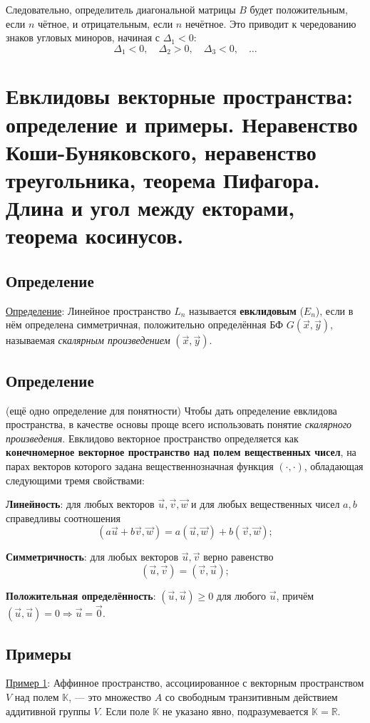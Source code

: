 \documentclass[12pt]{article}
\begin{document}
Следовательно, определитель диагональной матрицы $B$ будет положительным, если $n$ чётное, и отрицательным, если $n$ нечётное. Это приводит к чередованию знаков угловых миноров, начиная с $\Delta_1 < 0$:
\[
\Delta_1 < 0, \quad \Delta_2 > 0, \quad \Delta_3 < 0, \quad \dots
\]

\section{Евклидовы векторные пространства: определение и примеры. Неравенство Коши-Буняковского, неравенство треугольника, теорема Пифагора. Длина и угол между екторами, теорема косинусов.}

\subsection*{Определение}
\underline{Определение}: Линейное пространство $L_n$ называется \textbf{евклидовым} ($E_n$), если в нём определена симметричная, положительно определённая БФ $G(\vec{x}, \vec{y})$, называемая \textit{скалярным произведением} $(\vec{x}, \vec{y})$.

\subsection*{Определение}
(ещё одно определение для понятности) Чтобы дать определение евклидова пространства, в качестве основы проще всего использовать понятие \textit{скалярного произведения}. Евклидово векторное пространство определяется как \textbf{конечномерное векторное пространство над полем вещественных чисел}, на парах векторов которого задана вещественнозначная функция $(\cdot, \cdot)$, обладающая следующими тремя свойствами:


    
\textbf{Линейность}: для любых векторов $\vec{u}, \vec{v}, \vec{w}$ и для любых вещественных чисел $a, b$ справедливы соотношения  
    $$
    (a\vec{u} + b\vec{v}, \vec{w}) = a(\vec{u}, \vec{w}) + b(\vec{v}, \vec{w});
    $$
    
\textbf{Симметричность}: для любых векторов $\vec{u}, \vec{v}$ верно равенство  
    $$
    (\vec{u}, \vec{v}) = (\vec{v}, \vec{u});
    $$
    
\textbf{Положительная определённость}: $(\vec{u}, \vec{u}) \geq 0$ для любого $\vec{u}$, причём $(\vec{u}, \vec{u}) = 0 \Rightarrow \vec{u} = \vec{0}$.


\subsection*{Примеры}
\underline{Пример 1}: Аффинное пространство, ассоциированное с векторным пространством $V$ над полем $\mathbb{K}$, — это множество $A$ со свободным транзитивным действием аддитивной группы $V$. Если поле $\mathbb{K}$ не указано явно, подразумевается $\mathbb{K} = \mathbb{R}$.
\end{document}

